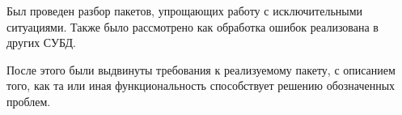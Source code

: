 Был проведен разбор пакетов, упрощающих работу с исключительными ситуациями. Также было рассмотрено как обработка ошибок реализована в других СУБД. 

После этого были выдвинуты требования к реализуемому пакету, с описанием того, как та или иная функциональность способствует решению обозначенных проблем. 




%
\newpage %

